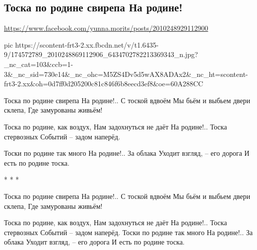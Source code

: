  
 
 
 
 

\subsection{Тоска по родине свирепа На родине!}
\label{sec:17_04_2021.fb.morits_junna.1.rodina}
\url{https://www.facebook.com/yunna.morits/posts/2010248929112900}

\ifcmt
  pic https://scontent-frt3-2.xx.fbcdn.net/v/t1.6435-9/174572789_2010248869112906_6434702782213369343_n.jpg?_nc_cat=103&ccb=1-3&_nc_sid=730e14&_nc_ohc=M5ZS4Dv5d5wAX8ADAx2&_nc_ht=scontent-frt3-2.xx&oh=0d7ff0d205200c81c846f6b8eecd3ef8&oe=60A288CC
\fi

Тоска по родине свирепа
На родине!.. С тоской вдвоём
Мы бьём и выбьем двери склепа,
Где замурованы живьём!

Тоска по родине, как воздух,
Нам задохнуться не даёт
На родине!.. Тоска стервозных
Событий – задом наперёд.

Тоски по родине так много
На родине!.. За облака
Уходит взгляд, – его дорога
И есть по родине тоска. 

* * *

Тоска по родине свирепа
На родине!.. С тоской вдвоём
Мы бьём и выбьем двери склепа,
Где замурованы живьём!

Тоска по родине, как воздух,
Нам задохнуться не даёт
На родине!.. Тоска стервозных
Событий – задом наперёд.
Тоски по родине так много
На родине!.. За облака
Уходит взгляд, – его дорога
И есть по родине тоска.

